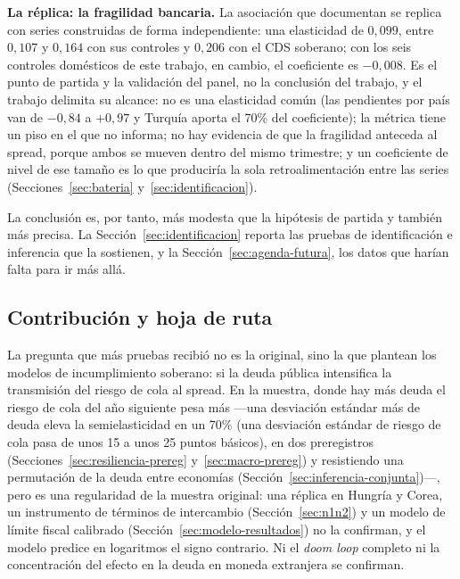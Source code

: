 \textbf{La réplica: la fragilidad bancaria.} La asociación que documentan \citet{Chari2024b} se replica con series construidas de forma independiente: una elasticidad de $0{,}099$, entre $0{,}107$ y $0{,}164$ con sus controles y $0{,}206$ con el CDS soberano; con los seis controles domésticos de este trabajo, en cambio, el coeficiente es $-0{,}008$. Es el punto de partida y la validación del panel, no la conclusión del trabajo, y el trabajo delimita su alcance: no es una elasticidad común (las pendientes por país van de $-0{,}84$ a $+0{,}97$ y Turquía aporta el 70\% del coeficiente); la métrica tiene un piso en el que no informa; no hay evidencia de que la fragilidad anteceda al spread, porque ambos se mueven dentro del mismo trimestre; y un coeficiente de nivel de ese tamaño es lo que produciría la sola retroalimentación entre las series (Secciones~\ref{sec:bateria} y~\ref{sec:identificacion}).

La conclusión es, por tanto, más modesta que la hipótesis de partida y también más precisa. La Sección~\ref{sec:identificacion} reporta las pruebas de identificación e inferencia que la sostienen, y la Sección~\ref{sec:agenda-futura}, los datos que harían falta para ir más allá.

\subsection{Contribución y hoja de ruta}

La pregunta que más pruebas recibió no es la original, sino la que plantean los modelos de incumplimiento soberano: si la deuda pública intensifica la transmisión del riesgo de cola al spread. En la muestra, donde hay más deuda el riesgo de cola del año siguiente pesa más ---una desviación estándar más de deuda eleva la semielasticidad en un 70\% (una desviación estándar de riesgo de cola pasa de unos 15 a unos 25 puntos básicos), en dos preregistros (Secciones~\ref{sec:resiliencia-prereg} y~\ref{sec:macro-prereg}) y resistiendo una permutación de la deuda entre economías (Sección~\ref{sec:inferencia-conjunta})---, pero es una regularidad de la muestra original: una réplica en Hungría y Corea, un instrumento de términos de intercambio (Sección~\ref{sec:n1n2}) y un modelo de límite fiscal calibrado (Sección~\ref{sec:modelo-resultados}) no la confirman, y el modelo predice en logaritmos el signo contrario. Ni el \textit{doom loop} completo ni la concentración del efecto en la deuda en moneda extranjera se confirman.


